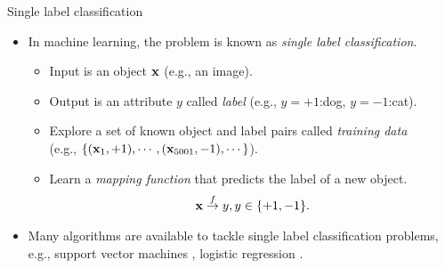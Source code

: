 \documentclass[first=dgreen,second=purple,logo=yellowexc]{aaltoslides}
\begin{document}
{\begin{frame}{Single label classification}
	\begin{itemize}
		\item In machine learning, the problem is known as \textit{single label classification}.
		\begin{itemize}
			\footnotesize
			\item Input is an object $\mathbf {x}$ (e.g., an image).
			\item Output is an attribute $y$ called \textit{label} (e.g., $y=+1$:dog, $y=-1$:cat).
			\item Explore a set of known object and label pairs called \textit{training data} \\
			(e.g., $\{(\mathbf {x}_1,+1),\cdots,(\mathbf {x}_{5001},-1),\cdots\}$).
			\item Learn a \textit{mapping function} that predicts the label of a new object.
			\begin{align*}
				\mathbf {x}\overset{f}{\rightarrow}y,y\in\{+1,-1\}.
			\end{align*}
		\end{itemize}
		\item Many algorithms are available to tackle single label classification problems, e.g., support vector machines \citep{Cortes95support}, logistic regression \citep{Chen99}.
	\end{itemize}
\end{frame}

}
\end{document}

